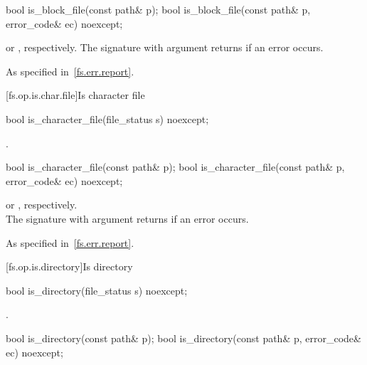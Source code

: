 %
\begin{itemdecl}
bool is_block_file(const path& p);
bool is_block_file(const path& p, error_code& ec) noexcept;
\end{itemdecl}

\begin{itemdescr}
\pnum
\returns
{} or , respectively.
The signature with argument  returns  if an error occurs.

\pnum
\throws
As specified in~\ref{fs.err.report}.
\end{itemdescr}


[fs.op.is.char.file]{Is character file}

%
\begin{itemdecl}
bool is_character_file(file_status s) noexcept;
\end{itemdecl}

\begin{itemdescr}
\pnum
\returns
{}.
\end{itemdescr}

%
\begin{itemdecl}
bool is_character_file(const path& p);
bool is_character_file(const path& p, error_code& ec) noexcept;
\end{itemdecl}

\begin{itemdescr}
\pnum
\returns
{}
  or ,
  respectively.\\The signature with argument  returns 
  if an error occurs.

\pnum
\throws
As specified in~\ref{fs.err.report}.
\end{itemdescr}


[fs.op.is.directory]{Is directory}

%
\begin{itemdecl}
bool is_directory(file_status s) noexcept;
\end{itemdecl}

\begin{itemdescr}
\pnum
\returns
{}.
\end{itemdescr}

%
\begin{itemdecl}
bool is_directory(const path& p);
bool is_directory(const path& p, error_code& ec) noexcept;
\end{itemdecl}


